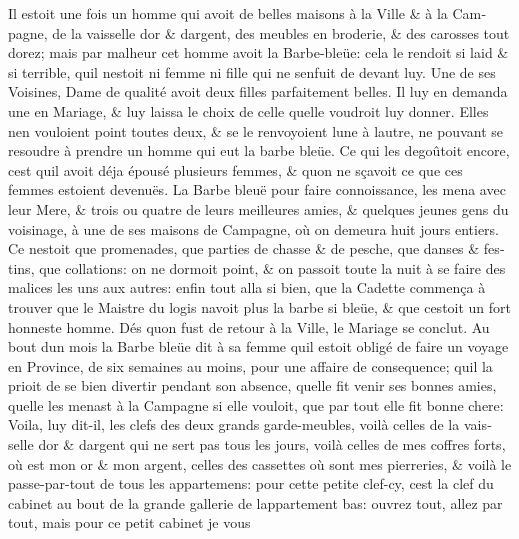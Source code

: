 \documentclass[14pt,a4paper]{memoir}
\begin{document}
\begin{otherlanguage}{french}
Il estoit une fois un homme qui avoit de belles maisons à la Ville \& à
la Campagne, de la vaisselle d\textquotesingle or \&
d\textquotesingle argent, des meubles en broderie, \& des carosses tout
dorez; mais par malheur cet homme avoit la Barbe-bleüe: cela le rendoit
si laid \& si terrible, qu\textquotesingle il n\textquotesingle estoit
ni femme ni fille qui ne s\textquotesingle enfuit de devant luy. Une de
ses Voisines, Dame de qualité avoit deux filles parfaitement belles. Il
luy en demanda une en Mariage, \& luy laissa le choix de celle
qu\textquotesingle elle voudroit luy donner. Elles n\textquotesingle en
vouloient point toutes deux, \& se le renvoyoient l\textquotesingle une
à l\textquotesingle autre, ne pouvant se resoudre à prendre un homme qui
eut la barbe bleüe. Ce qui les degoûtoit encore, c\textquotesingle est
qu\textquotesingle il avoit déja épousé plusieurs femmes, \&
qu\textquotesingle on ne sçavoit ce que ces femmes estoient devenuës. La
Barbe bleuë pour faire connoissance, les mena avec leur Mere, \& trois
ou quatre de leurs meilleures amies, \& quelques jeunes gens du
voisinage, à une de ses maisons de Campagne, où on demeura huit jours
entiers. Ce n\textquotesingle estoit que promenades, que parties de
chasse \& de pesche, que danses \& festins, que collations: on ne
dormoit point, \& on passoit toute la nuit à se faire des malices les
uns aux autres: enfin tout alla si bien, que la Cadette commença à
trouver que le Maistre du logis n\textquotesingle avoit plus la barbe si
bleüe, \& que c\textquotesingle estoit un fort honneste homme. Dés
qu\textquotesingle on fust de retour à la Ville, le Mariage se conclut.
Au bout d\textquotesingle un mois la Barbe bleüe dit à sa femme
qu\textquotesingle il estoit obligé de faire un voyage en Province, de
six semaines au moins, pour une affaire de consequence;
qu\textquotesingle il la prioit de se bien divertir pendant son absence,
qu\textquotesingle elle fit venir ses bonnes amies,
qu\textquotesingle elle les menast à la Campagne si elle vouloit, que
par tout elle fit bonne chere: Voila, luy dit-il, les clefs des deux
grands garde-meubles, voilà celles de la vaisselle d\textquotesingle or
\& d\textquotesingle argent qui ne sert pas tous les jours, voilà celles
de mes coffres forts, où est mon or \& mon argent, celles des cassettes
où sont mes pierreries, \& voilà le passe-par-tout de tous les
appartemens: pour cette petite clef-cy, c\textquotesingle est la clef du
cabinet au bout de la grande gallerie de l\textquotesingle appartement
bas: ouvrez tout, allez par tout, mais pour ce petit cabinet je vous

\end{otherlanguage}
\end{document}
